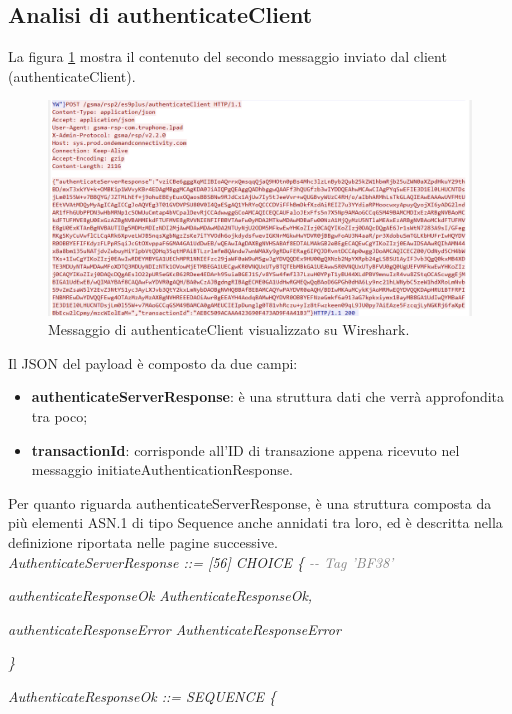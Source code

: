 \documentclass[10pt, oneside]{book}
\begin{document}
\subsection{Analisi di authenticateClient}
La figura \ref{fig:msg3-stream-pcap} mostra il contenuto del secondo messaggio inviato dal client (authenticateClient).\\
\begin{figure}
\includegraphics[width=\linewidth]{msg3-stream-pcap.png}
\caption{Messaggio di authenticateClient visualizzato su Wireshark.}
\label{fig:msg3-stream-pcap}
\end{figure}
Il JSON del payload è composto da due campi:
\begin{itemize}
\item \textbf{authenticateServerResponse}: è una struttura dati che verrà approfondita tra poco;
\item \textbf{transactionId}: corrisponde all'ID di transazione appena ricevuto nel messaggio initiateAuthenticationResponse.
\end{itemize}
Per quanto riguarda authenticateServerResponse, è una struttura composta da più elementi ASN.1 di tipo Sequence anche annidati tra loro, ed è descritta nella definizione riportata nelle pagine successive\cite{RSP-definitions}.\\

\textit{AuthenticateServerResponse ::= [56] CHOICE \{ \textcolor{gray}{{-}{-} Tag 'BF38'}}

\hspace{0.75cm} \textit{authenticateResponseOk AuthenticateResponseOk,}

\hspace{0.75cm} \textit{authenticateResponseError AuthenticateResponseError}

\textit{\}\\}

\textit{AuthenticateResponseOk ::= SEQUENCE \{}
\end{document}
